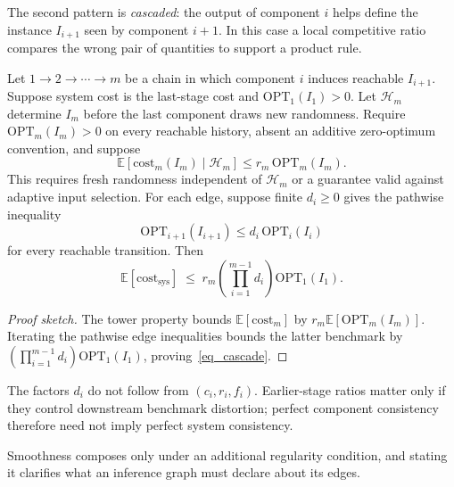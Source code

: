 \documentclass[acmsmall,screen,nonacm]{acmart}
\theoremstyle{acmdefinition}%
\begin{document}
The second pattern is \emph{cascaded}: the output of component $i$ helps define the instance $I_{i+1}$ seen by component $i+1$. In this case a local competitive ratio compares the wrong pair of quantities to support a product rule.

\begin{proposition}
\label{prop:cascade}
Let $1\to2\to\cdots\to m$ be a chain in which component $i$ induces reachable $I_{i+1}$. Suppose system cost is the last-stage cost and $\mathrm{OPT}_1(I_1)>0$. Let $\mathcal H_m$ determine $I_m$ before the last component draws new randomness. Require $\mathrm{OPT}_m(I_m)>0$ on every reachable history, absent an additive zero-optimum convention, and suppose
\[
  \mathbb E[\mathrm{cost}_m(I_m)\mid\mathcal H_m]
  \leq r_m\,\mathrm{OPT}_m(I_m).
\]
This requires fresh randomness independent of $\mathcal H_m$ or a guarantee valid against adaptive input selection. For each edge, suppose finite $d_i\geq0$ gives the pathwise inequality
\[
    \mathrm{OPT}_{i+1}(I_{i+1}) \leq d_i\,\mathrm{OPT}_i(I_i)
\]
for every reachable transition. Then
\begin{equation}
    \mathbb E[\mathrm{cost}_{\mathrm{sys}}]
    \;\leq\;
    r_m\!\left(\prod_{i=1}^{m-1} d_i\right)\mathrm{OPT}_1(I_1).
    \label{eq_cascade}
\end{equation}
\end{proposition}

\begin{proof}[Proof sketch]
The tower property bounds $\mathbb E[\mathrm{cost}_m]$ by $r_m\mathbb E[\mathrm{OPT}_m(I_m)]$. Iterating the pathwise edge inequalities bounds the latter benchmark by $(\prod_{i=1}^{m-1}d_i)\mathrm{OPT}_1(I_1)$, proving~\eqref{eq_cascade}.
\end{proof}

The factors $d_i$ do not follow from $(c_i,r_i,f_i)$. Earlier-stage ratios matter only if they control downstream benchmark distortion; perfect component consistency therefore need not imply perfect system consistency.

Smoothness composes only under an additional regularity condition, and stating it clarifies what an inference graph must declare about its edges.
\end{document}
